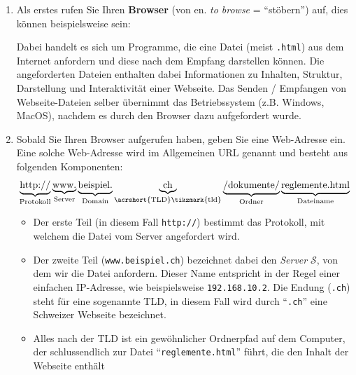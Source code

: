 \begin{enumerate}
	\item Als erstes rufen Sie Ihren \textbf{Browser} (von en. \textit{to browse} = ``stöbern'') auf, dies können beispielsweise sein:
	      Dabei handelt es sich um Programme, die eine Datei (meist \texttt{.html}) aus dem Internet anfordern und diese nach dem Empfang darstellen können.  Die angeforderten Dateien enthalten dabei Informationen zu Inhalten, Struktur, Darstellung und Interaktivität einer Webseite. Das Senden / Empfangen von Webseite-Dateien selber übernimmt das Betriebssystem (z.B. Windows, MacOS), nachdem es durch den Browser dazu aufgefordert wurde.
	\item Sobald Sie Ihren Browser aufgerufen haben, geben Sie eine Web-Adresse ein. Eine solche Web-Adresse wird im Allgemeinen \gls{URL} genannt und besteht aus folgenden Komponenten:
	      \[
		      \underbrace{\text{http://}}_{\text{Protokoll}}
		      \underbrace{\text{www.}}_{\text{Server}}
		      \underbrace{\text{beispiel.}}_{\text{Domain}}
		      \underbrace{\text{ch}}_{\text{\acrshort{TLD}\tikzmark{tld}}}
		      \underbrace{\text{/dokumente/}}_{\text{Ordner}}
		      \underbrace{\text{reglemente.html}}_{\text{Dateiname}}
	      \]

	      \begin{itemize}
		      \item Der erste Teil (in diesem Fall \texttt{http://}) bestimmt das Protokoll, mit welchem die Datei vom Server angefordert wird.
		      \item Der zweite Teil (\texttt{www.beispiel.ch}) bezeichnet dabei den \textit{Server} $\mathcal{S}$, von dem wir die Datei anfordern. Dieser Name entspricht in der Regel einer einfachen \gls{IP}-Adresse, wie beispielsweise \texttt{192.168.10.2}. Die Endung (\texttt{.ch}) steht für eine sogenannte \gls{TLD}, in diesem Fall wird durch ``\texttt{.ch}'' eine Schweizer Webseite bezeichnet.
		      \item Alles nach der \gls{TLD} ist ein gewöhnlicher Ordnerpfad auf dem Computer, der schlussendlich zur Datei ``\texttt{reglemente.html}'' führt, die den Inhalt der Webseite enthält
	      \end{itemize}
\end{enumerate}

